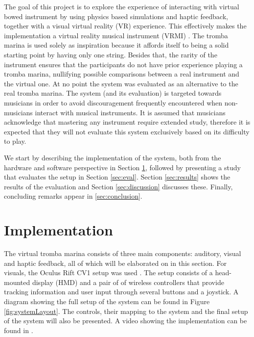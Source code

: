 The goal of this project is to explore the experience of interacting with virtual bowed instrument by using physics based simulations and haptic feedback, together with a visual virtual reality (VR) experience. This effectively makes the implementation a virtual reality musical instrument (VRMI) \cite{Serafin2016}. The tromba marina is used solely as inspiration because it affords itself to being a solid starting point by having only one string. Besides that, the rarity of the instrument ensures that the participants do not have prior experience playing a tromba marina, nullifying possible comparisons between a real instrument and the virtual one. At no point the system was evaluated as an alternative to the real tromba marina. The system (and its evaluation) is targeted towards musicians in order to avoid discouragement frequently encountered when non-musicians interact with musical instruments. It is assumed that musicians acknowledge that mastering any instrument require extended study, therefore it is expected that they will not evaluate this system exclusively based on its difficulty to play.

We start by describing the implementation of the system, both from the hardware and software perspective in Section \ref{sec:implementation}, followed by presenting a study that evaluates the setup in Section \ref{sec:eval}. Section \ref{sec:results} shows the results of the evaluation and Section \ref{sec:discussion} discusses these. Finally, concluding remarks appear in \ref{sec:conclusion}.

\section{Implementation}\label{sec:implementation}
The virtual tromba marina consists of three main components: auditory, visual and haptic feedback, all of which will be elaborated on in this section. For visuals, the Oculus Rift CV1 setup was used \cite{Oculus2020}. The setup consists of a head-mounted display (HMD) and a pair of of wireless controllers that provide tracking information and user input through several buttons and a joystick. A diagram showing the full setup of the system can be found in Figure \ref{fig:systemLayout}. The controls, their mapping to the system and the final setup of the system will also be presented. A video showing the implementation can be found in \cite{Trombavideo2020}.

